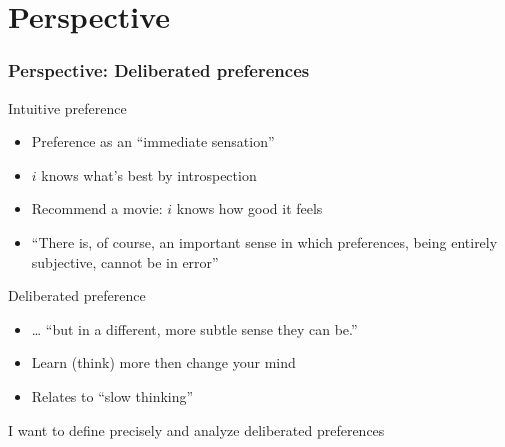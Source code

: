 \documentclass[french,english]{beamer}
\begin{document}
\section{Perspective}
\begin{frame}
	\frametitle{Perspective: Deliberated preferences}
	\begin{block}{Intuitive preference}
		\begin{itemize}
			\item Preference as an “immediate sensation” \citep{von_neumann_theory_1944}
			\item $i$ knows what’s best by introspection
			\item Recommend a movie: $i$ knows how good it feels
			\item “There is, of course, an important sense in which preferences, being entirely subjective, cannot be in error” \citep{savage_foundations_1972}
		\end{itemize}
	\end{block}
	\begin{block}{Deliberated preference}
		\begin{itemize}
			\item … “but in a different, more subtle sense they can be.”
			\item Learn (think) more then change your mind
			\item Relates to “slow thinking” \citep{kahneman_thinking_2013}
		\end{itemize}
	\end{block}
	I want to define precisely and analyze deliberated preferences
\end{frame}
\end{document}
